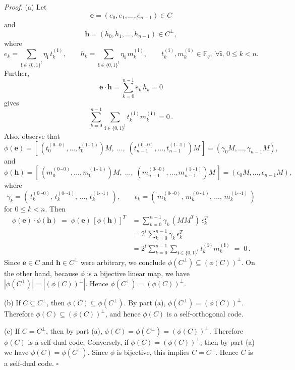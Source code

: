 \documentclass[12pt]{article}
\begin{document}
\textit{Proof.} (a) Let 
\[
\mathbf{e} = (e_0, e_1, \ldots, e_{n-1}) \in C
\] 
and 
\[
\mathbf{h} = (h_0, h_1, \ldots, h_{n-1}) \in C^{\perp},
\] 
where 
\[
e_k = \sum_{\mathbf{i} \in \{0,1\}^t} \eta_{\mathbf{i}}\, t_k^{(\mathbf{i})}, \qquad 
h_k = \sum_{\mathbf{i} \in \{0,1\}^t} \eta_{\mathbf{i}}\, m_k^{(\mathbf{i})}, \qquad 
t_k^{(\mathbf{i})}, m_k^{(\mathbf{i})} \in \mathbb{F}_q, \; \forall \mathbf{i}, \, 0 \le k < n.
\] 
Further, 
\[
\mathbf{e} \cdot \mathbf{h} = \sum_{k=0}^{n-1} e_k\, h_k = 0
\] 
gives 
\[
\sum_{k=0}^{n-1} \sum_{\mathbf{i} \in \{0,1\}^t} t_k^{(\mathbf{i})} m_k^{(\mathbf{i})} = 0\,.
\] 
Also, observe that 
\[
\phi(\mathbf{e}) = [\, (t_0^{(0\cdots0)}, \ldots, t_0^{(1\cdots1)})M, \;\ldots,\; (t_{n-1}^{(0\cdots0)}, \ldots, t_{n-1}^{(1\cdots1)})M\,] = (\gamma_0 M, \ldots, \gamma_{n-1} M),
\] 
and 
\[
\phi(\mathbf{h}) = [\, (m_0^{(0\cdots0)}, \ldots, m_0^{(1\cdots1)})M, \;\ldots,\; (m_{n-1}^{(0\cdots0)}, \ldots, m_{n-1}^{(1\cdots1)})M\,] = (\epsilon_0 M, \ldots, \epsilon_{n-1} M),
\] 
where 
\[
\gamma_k = (\, t_k^{(0\cdots0)},\, t_k^{(0\cdots1)},\, \ldots,\, t_k^{(1\cdots1)}\,), \qquad 
\epsilon_k = (\, m_k^{(0\cdots0)},\, m_k^{(0\cdots1)},\, \ldots,\, m_k^{(1\cdots1)}\,)
\] 
for $0 \le k < n$. Then 
\begin{align*}
    \phi(\mathbf{e}) \cdot \phi(\mathbf{h}) \;=\; \phi(\mathbf{e})\, [\phi(\mathbf{h})]^T 
    &= \sum_{k=0}^{n-1} \gamma_k\, (M M^T)\, \epsilon_k^T \\
    &= 2^t \sum_{k=0}^{n-1} \gamma_k\, \epsilon_k^T \\
    &= 2^t \sum_{k=0}^{n-1} \sum_{\mathbf{i} \in \{0,1\}^t} t_k^{(\mathbf{i})} m_k^{(\mathbf{i})} \;=\; 0\,.
\end{align*}
Since $\mathbf{e} \in C$ and $\mathbf{h} \in C^{\perp}$ were arbitrary, we conclude $\phi(C^{\perp}) \subseteq (\phi(C))^{\perp}$. On the other hand, because $\phi$ is a bijective linear map, we have $|\phi(C^{\perp})| = |(\phi(C))^{\perp}|$. Hence $\phi(C^{\perp}) = (\phi(C))^{\perp}$. 

\noindent (b) If $C \subseteq C^{\perp}$, then $\phi(C) \subseteq \phi(C^{\perp})$. By part (a), $\phi(C^{\perp}) = (\phi(C))^{\perp}$. Therefore $\phi(C) \subseteq (\phi(C))^{\perp}$, and hence $\phi(C)$ is a self-orthogonal code.

\noindent (c) If $C = C^{\perp}$, then by part (a), $\phi(C) = \phi(C^{\perp}) = (\phi(C))^{\perp}$. Therefore $\phi(C)$ is a self-dual code. Conversely, if $\phi(C) = (\phi(C))^{\perp}$, then by part (a) we have $\phi(C) = \phi(C^{\perp})$. Since $\phi$ is bijective, this implies $C = C^{\perp}$. Hence $C$ is a self-dual code. \hfill $\square$
\end{document}
